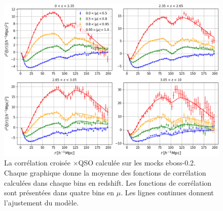 \begin{figure}
  \centering
  \includegraphics[scale=0.4]{xcf_eboss02_4bins}
  \caption{La corrélation croisée \lya{}$\times$QSO calculée sur les mocks eboss-0.2. Chaque graphique donne la moyenne des fonctions de corrélation calculées dans chaque bins en redshift. Les fonctions de corrélation sont présentées dans quatre bins en $\mu$. Les lignes continues donnent l'ajustement du modèle.}
  \label{fig:xcf_eboss02_4bins}
\end{figure}


